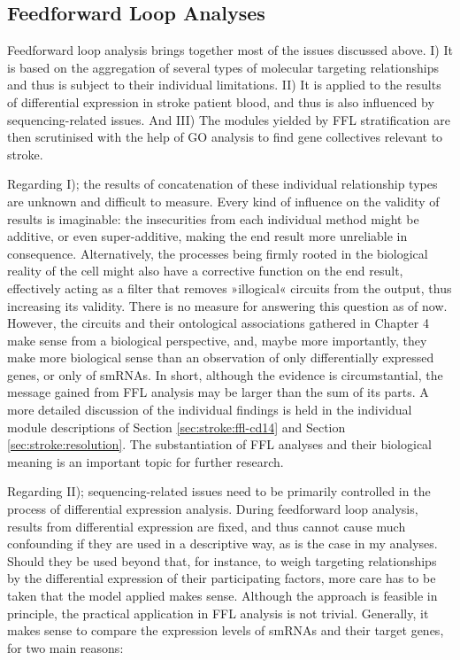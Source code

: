 \subsection{Feedforward Loop Analyses} \label{sec:discussion:ffl}
Feedforward loop analysis brings together most of the issues discussed above. I) It is based on the aggregation of several types of molecular targeting relationships and thus is subject to their individual limitations. II) It is applied to the results of differential expression in stroke patient blood, and thus is also influenced by sequencing-related issues. And III) The modules yielded by FFL stratification are then scrutinised with the help of GO analysis to find gene collectives relevant to stroke.

Regarding I); the results of concatenation of these individual relationship types are unknown and difficult to measure. Every kind of influence on the validity of results is imaginable: the insecurities from each individual method might be additive, or even super-additive, making the end result more unreliable in consequence. Alternatively, the processes being firmly rooted in the biological reality of the cell might also have a corrective function on the end result, effectively acting as a filter that removes »illogical« circuits from the output, thus increasing its validity. There is no measure for answering this question as of now. However, the circuits and their ontological associations gathered in Chapter 4 make sense from a biological perspective, and, maybe more importantly, they make more biological sense than an observation of only differentially expressed genes, or only of smRNAs. In short, although the evidence is circumstantial, the message gained from FFL analysis may be larger than the sum of its parts. A more detailed discussion of the individual findings is held in the individual module descriptions of Section \ref{sec:stroke:ffl-cd14} and Section \ref{sec:stroke:resolution}. The substantiation of FFL analyses and their biological meaning is an important topic for further research.

Regarding II); sequencing-related issues need to be primarily controlled in the process of differential expression analysis. During feedforward loop analysis, results from differential expression are fixed, and thus cannot cause much confounding if they are used in a descriptive way, as is the case in my analyses. Should they be used beyond that, for instance, to weigh targeting relationships by the differential expression of their participating factors, more care has to be taken that the model applied makes sense. Although the approach is feasible in principle, the practical application in FFL analysis is not trivial. Generally, it makes sense to compare the expression levels of smRNAs and their target genes, for two main reasons: 

